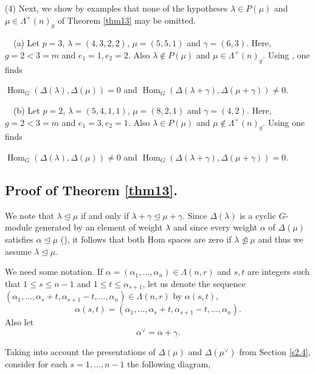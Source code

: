 \documentclass[ALCO,Unicode]{cedram}
\newcommand{\al}{\alpha}
\newcommand{\la}{\lambda}
\newcommand{\La}{\Lambda}
\DeclareMathOperator{\Hom}{Hom}
\numberwithin{equation}{section}
\begin{document}
\begin{exams}
		(4) Next, we show by examples that none of the hypotheses $\la \in P(\mu)$ and $ \mu \in \La^{+}(n)_g$ of Theorem \ref{thm13} may be omitted.
		
		\ \ (a) Let $p=3$, $\la=(4,3,2,2)$, $\mu=(5,5,1)$ and $\gamma=(6, 3)$. Here, $g=2<3=m$ and $e_1=1, e_2=2$. Also $\la \notin P(\mu)$ and $\mu \in \La^{+}(n)_g$. Using \cite{FGAP}, one finds  \begin{center}
			$\Hom_G(\Delta(\la),\Delta(\mu))=0$ and $\Hom_{G}(\Delta(\la+\gamma), \Delta(\mu+\gamma)) \neq 0$.
		\end{center}
		
		\ \ (b) Let $p=2$, $\lambda = (5,4,1,1)$, $\mu=(8,2,1)$ and $\gamma = (4,2)$. Here, $g=2<3=m$ and $e_1=3, e_2=1$. Also $\la \in P(\mu)$ and $\mu \notin \La^{+}(n)_g$. Using \cite{FGAP} one finds \begin{center}
			$\Hom_G(\Delta(\la),\Delta(\mu)) \neq 0$ and $\Hom_{G}(\Delta(\la+\gamma), \Delta(\mu+\gamma)) = 0$.
		\end{center}
	\end{exams}

	\subsection{Proof of Theorem \ref{thm13}.} \label{s4.2} We note that $\lambda \unlhd \mu$ if and only if $\lambda +\gamma \unlhd \mu + \gamma$. Since $\Delta{(\lambda)}$ is a cyclic $G$-module generated by an element of weight $\lambda$ and since every weight $\alpha$ of $\Delta(\mu)$ satisfies $\alpha \unlhd \mu$ (\cite[II 2.2 Prop]{Jan}), it follows that both Hom spaces are zero if $\lambda \ntrianglelefteq \mu$ and thus we assume $\lambda \unlhd \mu$.

We need some notation. If $\al=(\al_1,\dots,\al_n) \in \La(n,r)$ and $s, t$ are integers such that $1 \le s \le n-1$ and $1 \le t \le \al_{s+1} $, let us denote the sequence $(\al_1,\dots,\al_s+t, \al_{s+1}-t,\dots,\al_n) \in \La(n,r)$ by $\al({s,t})$, \[\al({s,t}) = (\al_1,\dots,\al_s+t, \al_{s+1}-t,\dots,\al_n). \] Also let \[\al^{\vee} =\al+\gamma.\]

Taking into account the presentations of $\Delta(\mu)$ and $\Delta(\mu ^{\vee})$ from Section \ref{s2.4}, consider for each $s=1,\dots,n-1$ the following diagram,
\end{document}
